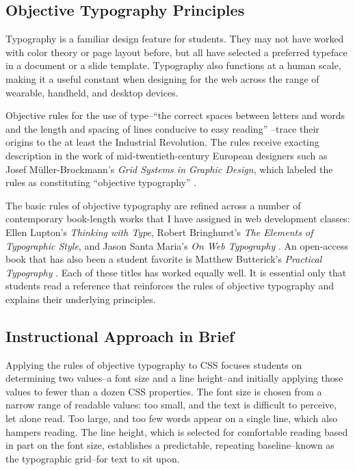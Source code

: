 \documentclass[sigplan,screen]{acmart}
\begin{document}
\subsection{Objective Typography Principles}

Typography is a familiar design feature for students. They may not have worked with color theory or page layout before, but all have selected a preferred typeface in a document or a slide template. Typography also functions at a human scale, making it a useful constant when designing for the web across the range of wearable, handheld, and desktop devices.

Objective rules for the use of type--“the correct spaces between letters and words and the length and spacing of lines conducive to easy reading” \cite[p.~19]{mb:grid}--trace their origins to the at least the Industrial Revolution. The rules receive exacting description in the work of mid-twentieth-century European designers such as Josef Müller-Brockmann’s {\itshape Grid Systems in Graphic Design}, which labeled the rules as constituting “objective typography” \cite[p.~7]{mb:grid}.

The basic rules of objective typography are refined across a number of contemporary book-length works that I have assigned in web development classes: Ellen Lupton’s {\itshape Thinking with Type}, Robert Bringhurst’s {\itshape The Elements of Typographic Style}, and Jason Santa Maria’s {\itshape On Web Typography} \cite{el:type,rb:style,jsm:owt}. An open-access book that has also been a student favorite is Matthew Butterick’s {\itshape Practical Typography} \cite{mb:pt}. Each of these titles has worked equally well. It is essential only that students read a reference that reinforces the rules of objective typography and explains their underlying principles.

\subsection{Instructional Approach in Brief}

Applying the rules of objective typography to CSS focuses students on determining two values--a font size and a line height--and initially applying those values to fewer than a dozen CSS properties. The font size is chosen from a narrow range of readable values: too small, and the text is difficult to perceive, let alone read. Too large, and too few words appear on a single line, which also hampers reading. The line height, which is selected for comfortable reading based in part on the font size, establishes a predictable, repeating baseline--known as the typographic grid--for text to sit upon. 
\end{document}
